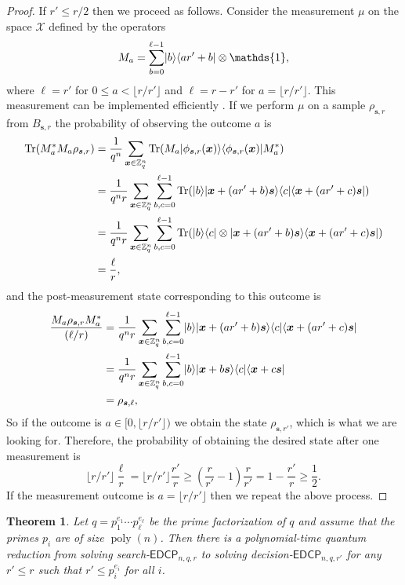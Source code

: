 \documentclass[11pt]{article}
\theoremstyle{plain}
\newtheorem{theorem}{Theorem}
\theoremstyle{definition}
\DeclareMathOperator{\tr}{Tr} %
\DeclareMathOperator{\poly}{poly}
\DeclarePairedDelimiter{\ldbrac}{\lvert}{\rangle}
\DeclarePairedDelimiter{\rdbrac}{\langle}{\rvert}
\def\Z{\ensuremath{\mathbb{Z}}}
\def\edcp{\ensuremath{\mathsf{EDCP}}}
\begin{document}
\begin{proof}
    If $r' \le r / 2$ then we proceed as follows. Consider the measurement $\mu$ on the space $\mathcal{X}$ defined by the operators
    \[ M_a = \sum_{b = 0}^{\ell - 1} \ldbrac{b}\rdbrac{ar' + b} \otimes \mathds{1}, \]
    where $\ell = r'$ for $0 \le a < \lfloor r / r'  \rfloor$ and $\ell = r - r'$ for $a = \lfloor r / r'  \rfloor$. This measurement can be implemented efficiently \cite{kaye2007introduction}. If we perform $\mu$ on a sample $\rho_{\bm{s}, r}$ from $B_{\bm{s}, r}$ the probability of observing the outcome $a$ is
    \begin{align*}
        \tr(M_a^*M_a \rho_{\bm{s}, r})
        & = \frac{1}{q^n} \sum_{\bm{x} \in \Z_q^n} \tr(M_a \ldbrac{\phi_{\bm{s}, r}(\bm{x})} \rdbrac{\phi_{\bm{s}, r}(\bm{x})} M_a^*) \\
        & = \frac{1}{q^nr} \sum_{\bm{x} \in \Z_q^n} \sum_{b, c = 0}^{\ell - 1} \tr(\ldbrac{b}\ldbrac{\bm{x} + (ar' + b)\bm{s}} \rdbrac{c}\rdbrac{\bm{x} + (ar' + c)\bm{s}}) \\
        & = \frac{1}{q^nr} \sum_{\bm{x} \in \Z_q^n} \sum_{b, c = 0}^{\ell - 1} \tr(\ldbrac{b}\rdbrac{c} \otimes \ldbrac{\bm{x} + (ar' + b)\bm{s}} \rdbrac{\bm{x} + (ar' + c)\bm{s}}) \\
        & = \frac{\ell}{r},
    \end{align*}
    and the post-measurement state corresponding to this outcome is
    \begin{align*}
        \frac{M_a \rho_{\bm{s}, r} M_a^*}{(\ell / r)}
        & = \frac{1}{q^nr} \sum_{\bm{x} \in \Z_q^n} \sum_{b, c = 0}^{\ell - 1} \ldbrac{b}\ldbrac{\bm{x} + (ar' + b)\bm{s}} \rdbrac{c}\rdbrac{\bm{x} + (ar' + c)\bm{s}} \\
        & = \frac{1}{q^nr} \sum_{\bm{x} \in \Z_q^n} \sum_{b, c = 0}^{\ell - 1} \ldbrac{b}\ldbrac{\bm{x} + b\bm{s}} \rdbrac{c}\rdbrac{\bm{x} + c\bm{s}} \\
        & = \rho_{\bm{s}, \ell},
    \end{align*}
    So if the outcome is $a \in [0, \lfloor r / r'  \rfloor)$ we obtain the state $\rho_{\bm{s}, r'}$, which is what we are looking for. Therefore, the probability of obtaining the desired state after one measurement is
    \[ \lfloor r / r' \rfloor \frac{\ell}{r} = \lfloor r / r' \rfloor \frac{r'}{r} \ge \left( \frac{r}{r'} - 1 \right)\frac{r}{r'} = 1 - \frac{r'}{r} \ge \frac{1}{2}. \]
    If the measurement outcome is $a = \lfloor r / r' \rfloor$ then we repeat the above process.
\end{proof}
\begin{theorem}
    Let $q = p_1^{e_1} \cdots p_\ell^{e_\ell}$ be the prime factorization of $q$ and assume that the primes $p_i$ are of size $\poly(n)$. Then there is a polynomial-time quantum reduction from solving search-$\edcp_{n, q, r}$ to solving decision-$\edcp_{n, q, r'}$ for any $r' \le r$ such that $r' \le p_i^{e_i}$ for all $i$. 
\end{theorem}
\end{document}
